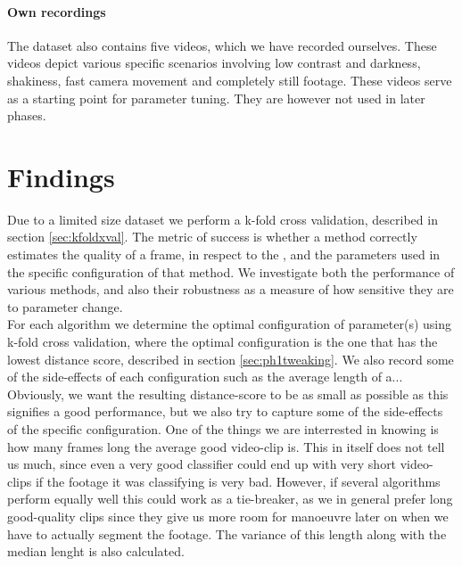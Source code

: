 \paragraph{Own recordings}
%
The dataset also contains five videos, which we have recorded ourselves. These videos depict various specific scenarios involving low contrast and darkness, shakiness, fast camera movement and completely still footage. These videos serve as a starting point for parameter tuning. They are however not used in later phases.
%
\section{Findings}
%
Due to a limited size dataset we perform a k-fold cross validation, described in section \ref{sec:kfoldxval}. The metric of success is whether a method correctly estimates the quality of a frame, in respect to the , and the parameters used in the specific configuration of that method. We investigate both the performance of various methods, and also their robustness as a measure of how sensitive they are to parameter change.\\
For each algorithm we determine the optimal configuration of parameter(s) using k-fold cross validation, where the optimal configuration is the one that has the lowest distance score, described in section \ref{sec:ph1tweaking}. We also record some of the side-effects of each configuration such as the average length of a...\\
Obviously, we want the resulting distance-score to be as small as possible as this signifies a good performance, but we also try to capture some of the side-effects of the specific configuration. One of the things we are interrested in knowing is how many frames long the average good video-clip is. This in itself does not tell us much, since even a very good classifier could end up with very short video-clips if the footage it was classifying is very bad. However, if several algorithms perform equally well this could work as a tie-breaker, as we in general prefer long good-quality clips since they give us more room for manoeuvre later on when we have to actually segment the footage. The variance of this length along with the median lenght is also calculated.
%
